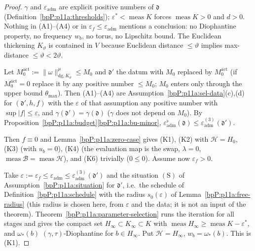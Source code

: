 \begin{proof}
\label{stepP:p11a:qt-order} $\gamma$ and $\varepsilon_{\mathrm{adm}}$ are explicit positive numbers of $\mathfrak d$ (Definition~\ref{bpP:p11a:thresholds}); $\varepsilon^*<\operatorname{meas}K$ forces $\operatorname{meas}K>0$ and $d>0$. Nothing in (A1)--(A4) or in $\varepsilon_f\le\varepsilon_{\mathrm{adm}}$ mentions a conclusion: no Diophantine property, no frequency $w_b$, no torus, no Lipschitz bound. The Euclidean thickening $K_\vartheta$ is contained in $V$ because Euclidean distance $\le\vartheta$ implies max-distance $\le\vartheta<2\vartheta$.

\label{stepP:p11a:qt-reduce} Let $M_0^{\mathrm{act}}:=\lVert\omega\rVert^\mu_{\mathrm{dg},K_\vartheta}\le M_0$ and $\mathfrak d'$ the datum with $M_0$ replaced by $M_0^{\mathrm{act}}$ (if $M_0^{\mathrm{act}}=0$ replace it by any positive number $\le M_0$; $M_0$ enters only through the upper bound $\theta_{\max}$). Then (A1)--(A4) are Assumption~\ref{bpP:p11a:sel-data}(c),(d) for $(\mathfrak d',h,f)$ with the $\varepsilon$ of that assumption any positive number with $\sup\lvert f\rvert\le\varepsilon$, and $\gamma(\mathfrak d')=\gamma(\mathfrak d)$ ($\gamma$ does not depend on $M_0$). By Proposition~\ref{bpP:p11a:budget}\ref{bpP:p11a:bu-minor}, $\varepsilon_{\mathrm{adm}}^\flat(\mathfrak d)\le\varepsilon^{(3)}_{\mathrm{adm}}(\mathfrak d')$.

\label{stepP:p11a:qt-zero} Then $f\equiv0$ and Lemma~\ref{bpP:p11a:zero-case} gives (K1), (K2) with $\mathcal H=H_0$, (K3) (with $u_b=0$), (K4) (the evaluation map is the swap, $\lambda=0$, $\operatorname{meas}\mathcal B=\operatorname{meas}\mathcal H$), and (K6) trivially ($0\le0$). Assume now $\varepsilon_f>0$.

\label{stepP:p11a:qt-iter} Take $\varepsilon:=\varepsilon_f\le\varepsilon_{\mathrm{adm}}\le\varepsilon^{(3)}_{\mathrm{adm}}(\mathfrak d')$ and the situation $(\mathrm S)$ of Assumption~\ref{bpP:p11a:situation} for $\mathfrak d'$, i.e.\ the schedule of Definition~\ref{bpP:p11a:schedule} with the radius $s_0(\varepsilon)$ of Lemma~\ref{bpP:p11a:free-radius} (this radius is chosen here, from $\varepsilon$ and the data; it is not an input of the theorem). Theorem~\ref{bpP:p11a:parameter-selection} runs the iteration for all stages and gives the compact set $H_\infty\subset K_\infty\subset K$ with $\operatorname{meas}H_\infty\ge\operatorname{meas}K-\varepsilon^*$, and $\omega_*(b)$ $(\gamma,\tau)$-Diophantine for $b\in H_\infty$. Put $\mathcal H=H_\infty$, $w_b=\omega_*(b)$. This is (K1).


\end{proof}
